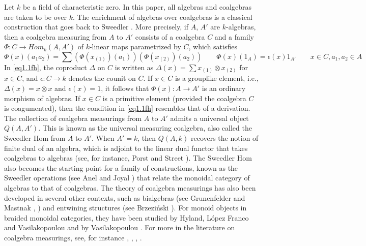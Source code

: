 \documentclass[10pt, colorlinks]{article}
\numberwithin{equation}{section} \DeclareMathSizes{2}{10}{12}{13}
\begin{document}
Let $k$ be a field of characteristic zero. In this paper, all algebras and coalgebras are taken to be over $k$. The enrichment of algebras over coalgebras is a classical construction that goes back to Sweedler \cite{SW}. More precisely, if $A$, $A'$ are $k$-algebras, then a coalgebra measuring from $A$ to $A'$ consists of a coalgebra $C$ and a family $\Phi:C\longrightarrow Hom_k(A,A')$ of $k$-linear maps parametrized by $C$, which satisfies 
 \begin{equation}\label{eq1.1fh}
        \Phi(x)(a_1a_2)=\sum(\Phi(x_{(1)})(a_1))(\Phi(x_{(2)})(a_2))\qquad\Phi(x)(1_A)=\epsilon(x)1_{A'} \qquad x\in C, a_1,a_2\in A
    \end{equation} In \eqref{eq1.1fh}, the coproduct $\Delta$ on $C$ is written as $\Delta(x)=\sum x_{(1)}\otimes x_{(2)}$ for $x\in C$, and $\epsilon:C\longrightarrow k$ denotes the counit on
    $C$. If $x\in C$ is a grouplike element, i.e., $\Delta(x)=x\otimes x$ and $\epsilon(x)=1$, it follows that $\Phi(x):A\longrightarrow A'$ is an ordinary morphism of algebras. If $x\in C$ is a primitive element (provided the coalgebra $C$ is coagumented), then the condition in \eqref{eq1.1fh} resembles that of a derivation. The collection of coalgebra measurings from $A$ to $A'$ admits a universal object $Q(A,A')$. This is known as the universal measuring coalgebra, also called the Sweedler Hom from $A$ to $A'$. When $A'=k$, then $Q(A,k)$ recovers the notion of finite dual of an algebra, which is adjoint to the linear dual functor that takes coalgebras to algebras (see, for instance, Porst and Street \cite{PS}).  The Sweedler Hom also becomes the starting point for a family of constructions, known as the Sweedler operations (see Anel and Joyal \cite{AJ}) that relate the monoidal category of algebras to that of coalgebras. The theory of coalgebra measurings has also been developed in several other contexts, such as bialgebras (see Grunenfelder and Mastnak \cite{GM1}, \cite{GM2}) and entwining structures (see Brzezi\'{n}ski \cite{Brz}). 
For monoid objects in braided monoidal categories, they have been studied by Hyland, L\'{o}pez Franco and Vasilakopoulou \cite{MLV} and by Vasilakopoulou \cite{Vas}.   For more in the literature on coalgebra measurings, see, for instance \cite{Bat0}, \cite{MB}, \cite{MH},  \cite{Lauve}. 
\end{document}
